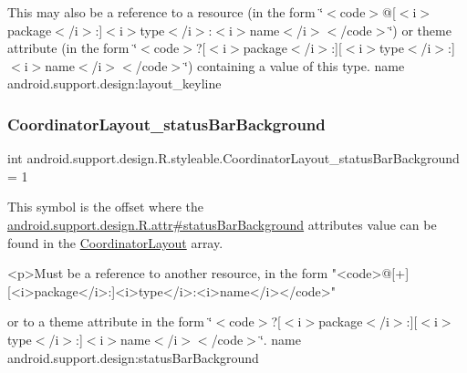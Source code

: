 This may also be a reference to a resource (in the form \char`\"{}$<$code$>$@\mbox{[}$<$i$>$package$<$/i$>$\+:\mbox{]}$<$i$>$type$<$/i$>$\+:$<$i$>$name$<$/i$>$$<$/code$>$\char`\"{}) or theme attribute (in the form \char`\"{}$<$code$>$?\mbox{[}$<$i$>$package$<$/i$>$\+:\mbox{]}\mbox{[}$<$i$>$type$<$/i$>$\+:\mbox{]}$<$i$>$name$<$/i$>$$<$/code$>$\char`\"{}) containing a value of this type.  name android.\+support.\+design\+:layout\+\_\+keyline \mbox{\label{classandroid_1_1support_1_1design_1_1R_1_1styleable_ab58445af81b09a3c56a576412fa98b25}} 
\subsubsection{\texorpdfstring{Coordinator\+Layout\+\_\+status\+Bar\+Background}{CoordinatorLayout\_statusBarBackground}}
{\footnotesize\ttfamily int android.\+support.\+design.\+R.\+styleable.\+Coordinator\+Layout\+\_\+status\+Bar\+Background = 1\hspace{0.3cm}{\ttfamily [static]}}

This symbol is the offset where the \hyperlink{classandroid_1_1support_1_1design_1_1R_1_1attr_a60b91d21d0adc859faed1dfaa213521a}{android.\+support.\+design.\+R.\+attr\#status\+Bar\+Background} attribute\textquotesingle{}s value can be found in the \hyperlink{classandroid_1_1support_1_1design_1_1R_1_1styleable_aa61378a506fc889e9e7af20a32b5fa05}{Coordinator\+Layout} array.

\begin{DoxyVerb}      <p>Must be a reference to another resource, in the form "<code>@[+][<i>package</i>:]<i>type</i>:<i>name</i></code>"
\end{DoxyVerb}
 or to a theme attribute in the form \char`\"{}$<$code$>$?\mbox{[}$<$i$>$package$<$/i$>$\+:\mbox{]}\mbox{[}$<$i$>$type$<$/i$>$\+:\mbox{]}$<$i$>$name$<$/i$>$$<$/code$>$\char`\"{}.  name android.\+support.\+design\+:status\+Bar\+Background \mbox{\label{classandroid_1_1support_1_1design_1_1R_1_1styleable_a340277a41103d3ce86cf1861cc50c1c9}} 
